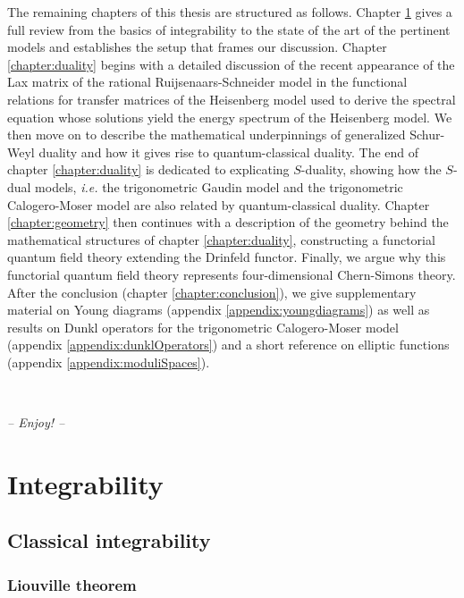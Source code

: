 \documentclass[11pt]{report}
\theoremstyle{definition}
\theoremstyle{remark}
\theoremstyle{remark}
\begin{document}
The remaining chapters of this thesis are structured as follows. Chapter \ref{chapter:integrability} gives a full review from the basics of integrability to the state of the art of the pertinent models and establishes the setup that frames our discussion. Chapter \ref{chapter:duality} begins with a detailed discussion of the recent appearance of the Lax matrix of the rational Ruijsenaars-Schneider model in the functional relations for transfer matrices of the Heisenberg model used to derive the spectral equation whose solutions yield the energy spectrum of the Heisenberg model. We then move on to describe the mathematical underpinnings of generalized Schur-Weyl duality and how it gives rise to quantum-classical duality. The end of chapter \ref{chapter:duality} is dedicated to explicating $S$-duality, showing how the $S$-dual models, \emph{i.e.} the trigonometric Gaudin model and the trigonometric Calogero-Moser model are also related by quantum-classical duality. Chapter \ref{chapter:geometry} then continues with a description of the geometry behind the mathematical structures of chapter \ref{chapter:duality}, constructing a functorial quantum field theory extending the Drinfeld functor. Finally, we argue why this functorial quantum field theory represents four-dimensional Chern-Simons theory. After the conclusion (chapter \ref{chapter:conclusion}), we give supplementary material on Young diagrams (appendix \ref{appendix:youngdiagrams}) as well as results on Dunkl operators for the trigonometric Calogero-Moser model (appendix \ref{appendix:dunklOperators}) and a short reference on elliptic functions (appendix \ref{appendix:moduliSpaces}).

~\\

\begin{center}
{\large \textit{-- Enjoy! --}}
\end{center}


\chapter{Integrability}\label{chapter:integrability}

\section{Classical integrability}

\subsection{Liouville theorem}
\end{document}
